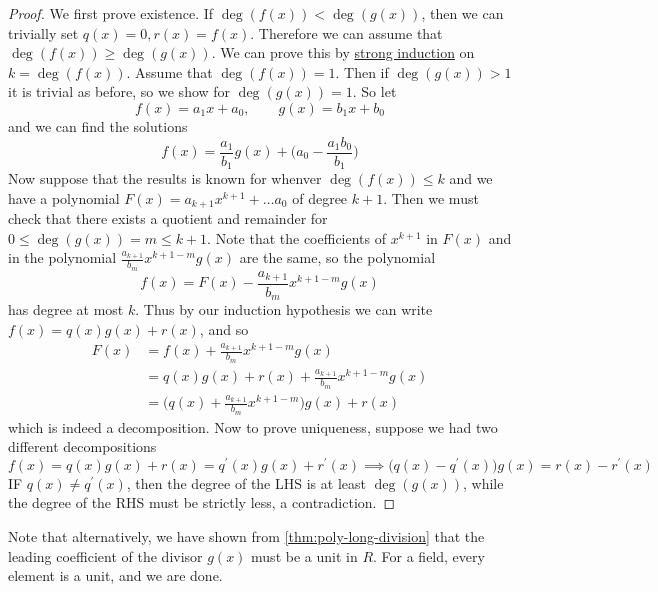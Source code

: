   \begin{proof}
    We first prove existence. If $\deg(f(x)) < \deg(g(x))$, then we can trivially set $q(x) = 0, r(x) = f(x)$. Therefore we can assume that $\deg(f(x)) \geq \deg(g(x))$. We can prove this by \hyperref[st-thm:strong-induction-principle]{strong induction} on $k = \deg(f(x))$. Assume that $\deg(f(x)) = 1$. Then if $\deg(g(x)) > 1$ it is trivial as before, so we show for $\deg(g(x)) = 1$. So let 
    \begin{equation}
      f(x) = a_1 x + a_0, \qquad g(x) = b_1 x + b_0 
    \end{equation}
    and we can find the solutions 
    \begin{equation}
      f(x) = \frac{a_1}{b_1} g(x) + \bigg( a_0 - \frac{a_1 b_0}{b_1} \bigg)
    \end{equation} 
    Now suppose that the results is known for whenver $\deg(f(x)) \leq k$ and we have a polynomial $F(x) = a_{k+1} x^{k+1} + \ldots a_0$ of degree $k+1$. Then we must check that there exists a quotient and remainder for $0 \leq \deg(g(x)) = m \leq k + 1$. Note that the coefficients of $x^{k+1}$ in $F(x)$ and in the polynomial $\frac{a_{k+1}}{b_m} x^{k+1-m} g(x)$ are the same, so the polynomial 
    \begin{equation}
      f(x) = F(x) - \frac{a_{k+1}}{b_m} x^{k+1-m} g(x) 
    \end{equation}
    has degree at most $k$. Thus by our induction hypothesis we can write $f(x) = q(x) g(x) + r(x)$, and so 
    \begin{align}
      F(x) & = f(x) + \frac{a_{k+1}}{b_m} x^{k+1-m} g(x) \\
           & = q(x) g(x) + r(x) + \frac{a_{k+1}}{b_m} x^{k+1-m} g(x) \\ 
           & = \bigg( q(x) + \frac{a_{k+1}}{b_m} x^{k+1-m} \bigg) g(x) + r(x)
    \end{align} 
    which is indeed a decomposition. Now to prove uniqueness, suppose we had two different decompositions 
    \begin{equation}
      f(x) = q(x) g(x) + r(x) = q^\prime (x) g(x) + r^\prime (x) \implies \big( q(x) - q^\prime (x) \big) g(x) = r(x) - r^\prime (x)  
    \end{equation}  
    IF $q(x) \neq q^\prime (x)$, then the degree of the LHS is at least $\deg(g(x))$, while the degree of the RHS must be strictly less, a contradiction. 
  \end{proof}

  Note that alternatively, we have shown from \ref{thm:poly-long-division} that the leading coefficient of the divisor $g(x)$ must be a unit in $R$. For a field, every element is a unit, and we are done. 


